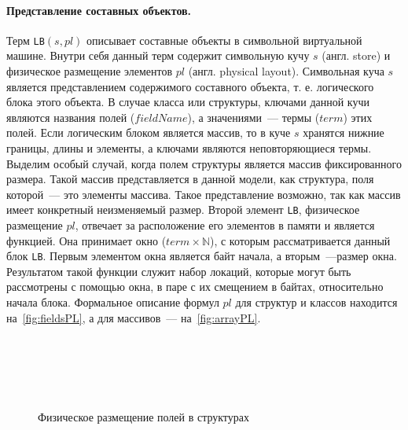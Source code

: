 \paragraph{Представление составных объектов.}
Терм \texttt{LB}$(s,pl)$ описывает составные объекты в символьной виртуальной машине. Внутри себя данный терм содержит символьную кучу $s$ (англ. store) и физическое размещение элементов $pl$ (англ. physical layout). Символьная куча $s$ является представлением содержимого составного объекта, т. е. логического блока этого объекта. В случае класса или структуры, ключами данной кучи являются названия полей ($fieldName$), а значениями~--- термы ($term$) этих полей. Если логическим блоком является массив, то в куче $s$ хранятся нижние границы, длины и элементы, а ключами являются неповторяющиеся термы. Выделим особый случай, когда полем структуры является массив фиксированного размера. Такой массив представляется в данной модели, как структура, поля которой~--- это элементы массива. Такое представление возможно, так как массив имеет конкретный неизменяемый размер. Второй элемент \texttt{LB}, физическое размещение $pl$, отвечает за расположение его элементов в памяти и является функцией. Она принимает окно ($term \times \mathbb{N}$), с которым рассматривается данный блок \texttt{LB}. Первым элементом окна является байт начала, а вторым~---размер окна. Результатом такой функции служит набор локаций, которые могут быть рассмотрены с помощью окна, в паре с их смещением в байтах, относительно начала блока. Формальное описание формул $pl$ для структур и классов находится на~\autoref{fig:fieldsPL}, а для массивов~--- на~\autoref{fig:arrayPL}.

\begin{figure}
\centering
\tiny
\setlength{\jot}{1pt}
\begin{mymathbox}
     \\
     \\
     \\
     \\
\end{mymathbox}
\normalsize
\caption{Физическое размещение полей в структурах}
\label{fig:fieldsPL}
\end{figure}

